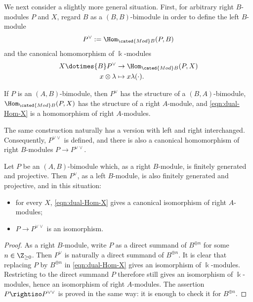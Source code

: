 We next consider a slightly more general situation. First, for arbitrary
right $B$-modules $P$ and $X$, regard $B$ as a $(B,B)$-bimodule in order to
define the left $B$-module
\begin{equation}\label{eqn:P-vee}
	P^\vee := \Hom_{\cated{Mod}B}(P, B)
\end{equation}
and the canonical homomorphism of $\Bbbk$-modules
\begin{equation}\label{eqn:dual-Hom-X}\begin{aligned}
	X \dotimes{B} P^\vee & \to \Hom_{\cated{Mod}B}(P, X) \\
	x \otimes \lambda & \mapsto x \lambda(\cdot).
\end{aligned}\end{equation}

If $P$ is an $(A,B)$-bimodule, then $P^\vee$ has the structure of a
$(B,A)$-bimodule, $\Hom_{\cated{Mod}B}(P,X)$ has the structure of a right
$A$-module, and \eqref{eqn:dual-Hom-X} is a homomorphism of right
$A$-modules.

The same construction naturally has a version with left and right
interchanged. Consequently, $P^{\vee\vee}$ is defined, and there is also a
canonical homomorphism of right $B$-modules $P\to P^{\vee\vee}$.

\begin{lemma}\label{prop:AB-comonad-aux}
	Let $P$ be an $(A,B)$-bimodule which, as a right $B$-module, is finitely
	generated and projective. Then $P^\vee$, as a left $B$-module, is also
	finitely generated and projective, and in this situation:
	\begin{itemize}
		\item for every $X$, \eqref{eqn:dual-Hom-X} gives a canonical
		isomorphism of right $A$-modules;
		\item $P\to P^{\vee\vee}$ is an isomorphism.
	\end{itemize}
\end{lemma}
\begin{proof}
	As a right $B$-module, write $P$ as a direct summand of $B^{\oplus n}$ for
	some $n\in\Z_{\geq0}$. Then $P^\vee$ is naturally a direct summand of
	$B^{\oplus n}$. It is clear that replacing $P$ by $B^{\oplus n}$ in
	\eqref{eqn:dual-Hom-X} gives an isomorphism of $\Bbbk$-modules. Restricting
	to the direct summand $P$ therefore still gives an isomorphism of
	$\Bbbk$-modules, hence an isomorphism of right $A$-modules. The assertion
	$P\rightiso P^{\vee\vee}$ is proved in the same way: it is enough to check
	it for $B^{\oplus n}$.
\end{proof}

